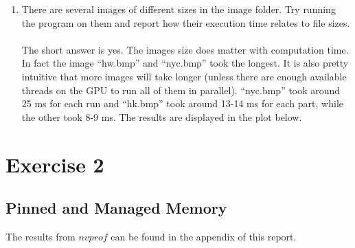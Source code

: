 \documentclass[english]{exam}
\begin{document}
\begin{enumerate}
\item There are several images of different sizes in the image folder. Try running the program on them and report how their execution time relates to file sizes.\\\\
  The short answer is yes. The images size does matter with computation time. In fact the image ``hw.bmp'' and ``nyc.bmp'' took the longest. It is also pretty intuitive that more images will take longer (unless there are enough available threads on the GPU to run all of them in parallel). ``nyc.bmp'' took around 25 ms for each run and ``hk.bmp'' took around 13-14 ms for each part, while the other took 8-9 ms. The results are displayed in the plot below.

\end{enumerate}

\clearpage
\chapter{Exercise 2}
\section*{Pinned and Managed Memory}

The results from $nvprof$ can be found in the appendix of this report.
\end{document}
